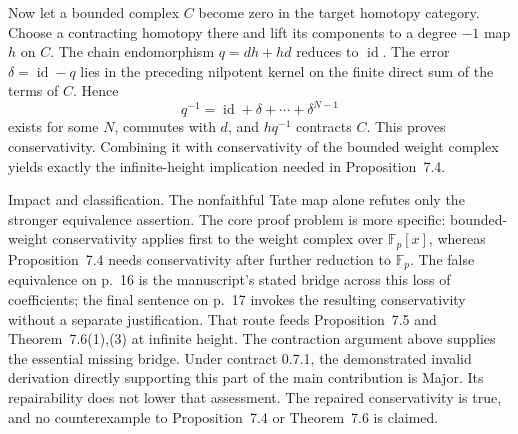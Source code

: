 \documentclass[10pt]{article}
\begin{document}
Now let a bounded complex \(C\) become zero in the target homotopy category. Choose a contracting homotopy there and lift its components to a degree \(-1\) map \(h\) on \(C\). The chain endomorphism \(q=dh+hd\) reduces to \(\operatorname{id}\). The error \(\delta=\operatorname{id}-q\) lies in the preceding nilpotent kernel on the finite direct sum of the terms of \(C\). Hence \[q^{-1}=\operatorname{id}+\delta+\cdots+\delta^{N-1}\] exists for some \(N\), commutes with \(d\), and \(hq^{-1}\) contracts \(C\). This proves conservativity. Combining it with conservativity of the bounded weight complex yields exactly the infinite-height implication needed in Proposition 7.4.\par
Impact and classification. The nonfaithful Tate map alone refutes only the stronger equivalence assertion. The core proof problem is more specific: bounded-weight conservativity applies first to the weight complex over \(\mathbb F_p[x]\), whereas Proposition 7.4 needs conservativity after further reduction to \(\mathbb F_p\). The false equivalence on p. 16 is the manuscript’s stated bridge across this loss of coefficients; the final sentence on p. 17 invokes the resulting conservativity without a separate justification. That route feeds Proposition 7.5 and Theorem 7.6(1),(3) at infinite height. The contraction argument above supplies the essential missing bridge. Under contract 0.7.1, the demonstrated invalid derivation directly supporting this part of the main contribution is Major. Its repairability does not lower that assessment. The repaired conservativity is true, and no counterexample to Proposition 7.4 or Theorem 7.6 is claimed.\par
\end{document}
